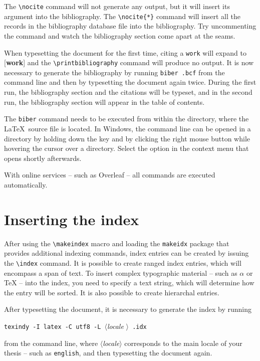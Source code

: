 \documentclass[
  digital, %
  table,   %
  lof,     %
  lot,     %
]{fithesis3}
\begin{document}
The \verb"\nocite" command will not generate any
output\nocite{booklet-full}, but it will insert its argument into
the bibliography. The \verb"\nocite{*}" command will insert all the
records in the bibliography database file into the bibliography.
Try uncommenting the command
and watch the bibliography section come apart at the seams.

When typesetting the document for the first time, citing a
\texttt{work} will expand to [\textbf{work}] and the
\verb"\printbibliography" command will produce no output. It is now
necessary to generate the bibliography by running \texttt{biber
\jobname.bcf} from the command line and then by typesetting the
document again twice. During the first run, the bibliography
section and the citations will be typeset, and in the second run,
the bibliography section will appear in the table of contents.

The \texttt{biber} command needs to be executed from within the
directory, where the \LaTeX\ source file is located. In Windows,
the command line can be opened in a directory by holding down the
 key and by clicking the right mouse button while
hovering the cursor over a directory.  Select the  option in the context menu that opens shortly
afterwards.

With online services -- such as Overleaf -- all commands are
executed automatically.

{\makeatletter %
  \thesis@selectLocale{\thesis@locale}\makeatother
\printbibliography[heading=bibintoc]} %

\chapter{Inserting the index}
After using the \verb"\makeindex" macro and loading the
\texttt{makeidx} package that provides additional indexing
commands, index entries can be created by issuing the \verb"\index"
command. It is possible to create ranged index
entries, which will encompass a span of text.
To insert complex typographic material -- such as $\alpha$
 or \TeX{}  --
into the index, you need to specify a text string, which will
determine how the entry will be sorted. It is also possible to
create hierarchal entries. 

After typesetting the document, it is necessary to generate the
index by running
\begin{center}%
  \texttt{texindy -I latex -C utf8 -L }$\langle$\textit{locale}%
  $\rangle$\texttt{ \jobname.idx}
\end{center}
from the command line, where $\langle$\textit{locale}$\rangle$
corresponds to the main locale of your thesis -- such as
\texttt{english}, and then typesetting the document again.
\end{document}
